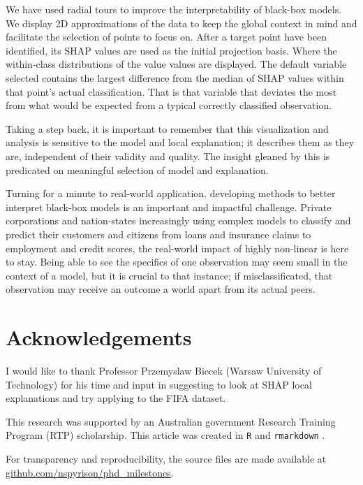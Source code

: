 \documentclass{template/monashthesis}
\begin{document}
We have used radial tours to improve the interpretability of black-box models. We display 2D approximations of the data to keep the global context in mind and facilitate the selection of points to focus on. After a target point have been identified, its SHAP values are used as the initial projection basis. Where the within-class distributions of the value values are displayed. The default variable selected contains the largest difference from the median of SHAP values within that point's actual classification. That is that variable that deviates the most from what would be expected from a typical correctly classified observation.

Taking a step back, it is important to remember that this visualization and analysis is sensitive to the model and local explanation; it describes them as they are, independent of their validity and quality. The insight gleaned by this is predicated on meaningful selection of model and explanation.

Turning for a minute to real-world application, developing methods to better interpret black-box models is an important and impactful challenge. Private corporations and nation-states increasingly using complex models to classify and predict their customers and citizens from loans and insurance claims to employment and credit scores, the real-world impact of highly non-linear is here to stay. Being able to see the specifics of one observation may seem small in the context of a model, but it is crucial to that instance; if misclassificated, that observation may receive an outcome a world apart from its actual peers.

\hypertarget{sec:acknowledgements}{%
\chapter{Acknowledgements}\label{sec:acknowledgements}}

I would like to thank Professor Przemyslaw Biecek (Warsaw University of Technology) for his time and input in suggesting to look at SHAP local explanations and try applying to the FIFA dataset.

This research was supported by an Australian government Research Training Program (RTP) scholarship. This article was created in \texttt{R} \autocite{r_core_team_r:_2020} and \texttt{rmarkdown} \autocite{xie_r_2018}.

For transparency and reproducibility, the source files are made available at \href{https://github.com/nspyrison/phd_milestones}{github.com/nspyrison/phd\_milestones}.
\end{document}
